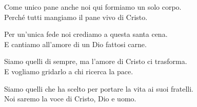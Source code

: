 
\strofa Come unico pane anche noi qui formiamo un solo corpo.\\
Perché tutti mangiamo il pane vivo di Cristo.

\spazio


\spazio

\strofa Per un'unica fede noi crediamo a questa santa cena.\\
E cantiamo all'amore di un Dio fattosi carne.

\spazio


\spazio

\strofa Siamo quelli di sempre, ma l'amore di Cristo ci trasforma.\\
E vogliamo gridarlo a chi ricerca la pace.

\spazio


\spazio

\strofa Siamo quelli che ha scelto per portare la vita ai suoi fratelli.\\
Noi saremo la voce di Cristo, Dio e uomo.

\spazio

